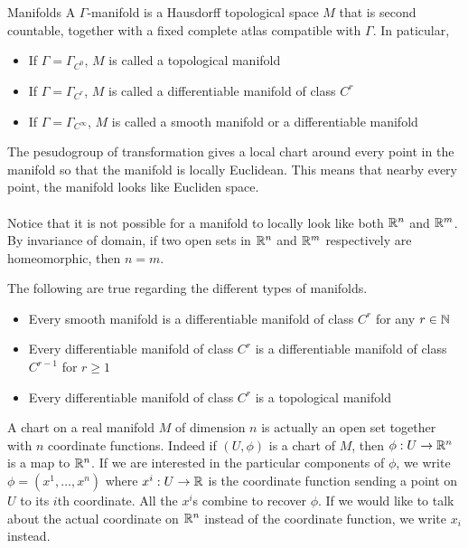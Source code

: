 \documentclass[a4paper]{article}
\begin{document}
\begin{defn}{Manifolds}{} A $\Gamma$-manifold is a Hausdorff topological space $M$ that is second countable, together with a fixed complete atlas compatible with $\Gamma$. In paticular, 
\begin{itemize}
\item If $\Gamma=\Gamma_{C^0}$, $M$ is called a topological manifold
\item If $\Gamma=\Gamma_{C^r}$, $M$ is called a differentiable manifold of class $C^r$
\item If $\Gamma=\Gamma_{C^\infty}$, $M$ is called a smooth manifold or a differentiable manifold
\end{itemize}
\end{defn}

The pesudogroup of transformation gives a local chart around every point in the manifold so that the manifold is locally Euclidean. This means that nearby every point, the manifold looks like Eucliden space. \\~\\

Notice that it is not possible for a manifold to locally look like both $\mathbb{R}^n$ and $\mathbb{R}^m$. By invariance of domain, if two open sets in $\mathbb{R}^n$ and $\mathbb{R}^m$ respectively are homeomorphic, then $n=m$. 

\begin{lmm}{}{} The following are true regarding the different types of manifolds. 
\begin{itemize}
\item Every smooth manifold is a differentiable manifold of class $C^r$ for any $r\in\mathbb{N}$
\item Every differentiable manifold of class $C^r$ is a differentiable manifold of class $C^{r-1}$ for $r\geq 1$
\item Every differentiable manifold of class $C^r$ is a topological manifold
\end{itemize}
\end{lmm}

A chart on a real manifold $M$ of dimension $n$ is actually an open set together with $n$ coordinate functions. Indeed if $(U,\phi)$ is a chart of $M$, then $\phi:U\to\mathbb{R}^n$ is a map to $\mathbb{R}^n$. If we are interested in the particular components of $\phi$, we write $\phi=(x^1,\dots,x^n)$ where $x^i:U\to\mathbb{R}$ is the coordinate function sending a point on $U$ to its $i$th coordinate. All the $x^i$s combine to recover $\phi$. If we would like to talk about the actual coordinate on $\mathbb{R}^n$ instead of the coordinate function, we write $x_i$ instead. 
\end{document}
